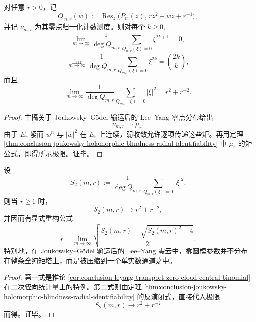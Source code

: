 \begin{corollary}\label{cor:conclusion-leyang-transport-zero-cloud-central-binomial}
对任意 \(r>0\)，记
\[
Q_{m,r}(w):=\operatorname{Res}_{z}\!\bigl(P_m(z),\,rz^2-wz+r^{-1}\bigr),
\]
并记 \(\nu_{m,r}\) 为其零点归一化计数测度。则对每个 \(k\ge0\),
\[
\lim_{m\to\infty}\frac1{\deg Q_{m,r}}
\sum_{Q_{m,r}(\xi)=0}\xi^{2k+1}=0,
\]
\[
\lim_{m\to\infty}\frac1{\deg Q_{m,r}}
\sum_{Q_{m,r}(\xi)=0}\xi^{2k}=\binom{2k}{k},
\]
而且
\[
\lim_{m\to\infty}\frac1{\deg Q_{m,r}}
\sum_{Q_{m,r}(\xi)=0}|\xi|^2
=
r^2+r^{-2}.
\]
\end{corollary}
\begin{proof}
主稿关于 Joukowsky--G\"odel 输运后的 Lee--Yang 零点分布给出
\[
\nu_{m,r}\Rightarrow \mu_r.
\]
由于 \(E_r\) 紧而 \(w^n\) 与 \(|w|^2\) 在 \(E_r\) 上连续，弱收敛允许逐项传递这些矩。再用定理 \ref{thm:conclusion-joukowsky-holomorphic-blindness-radial-identifiability} 中 \(\mu_r\) 的矩公式，即得所示极限。证毕。
\end{proof}

\begin{proposition}[经验径向矩的单标量反演]\label{prop:conclusion-joukowsky-radial-second-moment-single-scalar-inversion}
设
\[
S_{2}(m,r):=\frac1{\deg Q_{m,r}}
\sum_{Q_{m,r}(\xi)=0}|\xi|^2 .
\]
则当 \(r\ge1\) 时，
\[
S_{2}(m,r)\longrightarrow r^2+r^{-2},
\]
并因而有显式重构公式
\[
r=
\lim_{m\to\infty}
\sqrt{\frac{S_{2}(m,r)+\sqrt{S_{2}(m,r)^2-4}}{2}}.
\]
特别地，在 Joukowsky--Gödel 输运后的 Lee--Yang 零云中，椭圆模参数并不分布在整条全纯矩塔上，而是被压缩到一个单实数通道之中。
\end{proposition}
\begin{proof}
第一式是推论 \ref{cor:conclusion-leyang-transport-zero-cloud-central-binomial} 在二次径向统计量上的特例。第二式则由定理 \ref{thm:conclusion-joukowsky-holomorphic-blindness-radial-identifiability} 的反演闭式，直接代入极限
\[
S_2(m,r)\to r^2+r^{-2}
\]
而得。证毕。
\end{proof}

